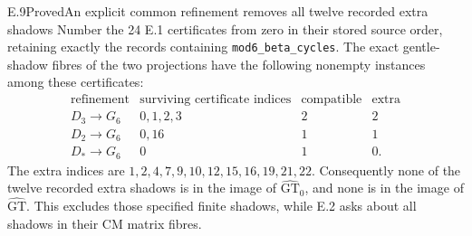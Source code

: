 \begin{statement}{E.9}{Proved}{An explicit common refinement removes all twelve recorded extra shadows}
Number the 24 E.1 certificates from zero in their stored source order,
retaining exactly the records containing \texttt{mod6\_beta\_cycles}.
The exact gentle-shadow fibres of the two projections have the following
nonempty instances among these certificates:
\[
\begin{array}{c|l|rr}
\text{refinement}&\text{surviving certificate indices}
 &\text{compatible}&\text{extra}\\\hline
 D_3\to G_6&0,1,2,3&2&2\\
 D_2\to G_6&0,16&1&1\\
 D_*\to G_6&0&1&0.
\end{array}
\]
The extra indices are
$1,2,4,7,9,10,12,15,16,19,21,22$.
Consequently none of the twelve recorded extra shadows is in the
image of $\widehat{\mathrm{GT}}_0$, and none is in the image of
$\widehat{\mathrm{GT}}$. This excludes those specified finite
shadows, while E.2 asks about all shadows in their CM matrix fibres.
\end{statement}
